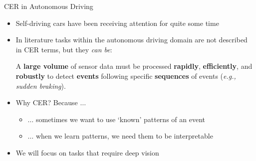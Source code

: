 \documentclass[10pt, aspectratio=169]{beamer}
\begin{document}
\begin{frame}{CER in Autonomous Driving}
    \begin{itemize}
        \setlength{\itemsep}{12pt}
        \item Self-driving cars have been receiving attention for quite some time %
        \item In literature tasks within the autonomous driving domain are not described in CER terms, but they \textit{can be}:  \\
        \vspace{0.6em}
        \begin{center}
         A \textbf{large volume} of sensor data must be processed \textbf{rapidly}, \textbf{efficiently}, and \textbf{robustly} to detect \textbf{events} following specific \textbf{sequences} of events (\textit{e.g., sudden braking}).
          \end{center}
        \item \textcolor{umBlueLighter}{Why CER?} Because $\dots$
        \vspace{0.6em}
            \begin{itemize}
            \setlength{\itemsep}{4pt}
                \item $\dots$ sometimes we want to use `known' patterns of an event
                \item $\dots$ when we learn patterns, we need them to be interpretable
            \end{itemize}
        \item We will focus on tasks that require deep vision %
    \end{itemize}
\end{frame}
\end{document}
